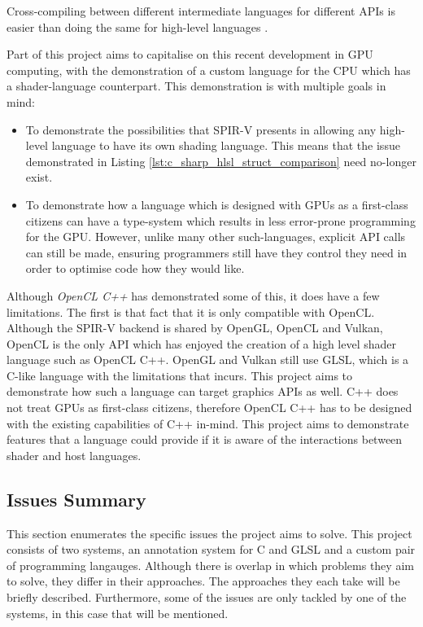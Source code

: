 \documentclass[a4paper,12pt,twoside,openright]{report}
\begin{document}
Cross-compiling between different intermediate languages for different APIs is
easier than doing the same for high-level languages \cite{TODO}.

Part of this project aims to capitalise on this recent development in GPU
computing, with the demonstration of a custom language for the CPU which has a
shader-language counterpart. This demonstration is with multiple goals in mind:

\begin{itemize}

    \item To demonstrate the possibilities that SPIR-V presents in allowing any
    high-level language to have its own shading language. This means that the
    issue demonstrated in Listing \ref{lst:c_sharp_hlsl_struct_comparison}
    need no-longer exist.

    \item To demonstrate how a language which is designed with GPUs as a
    first-class citizens can have a type-system which results in less
    error-prone programming for the GPU. However, unlike many other
    such-languages, explicit API calls can still be made, ensuring programmers
    still have they control they need in order to optimise code how they would
    like.

\end{itemize}

Although \textit{OpenCL C++} has demonstrated some of this, it does have a few
limitations. The first is that fact that it is only compatible with OpenCL.
Although the SPIR-V backend is shared by OpenGL, OpenCL and Vulkan, OpenCL is
the only API which has enjoyed the creation of a high level shader language
such as OpenCL C++. OpenGL and Vulkan still use GLSL, which is a C-like
language with the limitations that incurs. This project aims to demonstrate how
such a language can target graphics APIs as well. C++ does not treat GPUs as
first-class citizens, therefore OpenCL C++ has to be designed with the existing
capabilities of C++ in-mind. This project aims to demonstrate features that a
language could provide if it is aware of the interactions between shader and
host languages.

\subsection{Issues Summary}

\label{sec:issues_summary}

This section enumerates the specific issues the project aims to solve. This
project consists of two systems, an annotation system for C and GLSL and a
custom pair of programming langauges. Although there is overlap in which
problems they aim to solve, they differ in their approaches. The approaches
they each take will be briefly described. Furthermore, some of the issues are
only tackled by one of the systems, in this case that will be mentioned.
\end{document}
